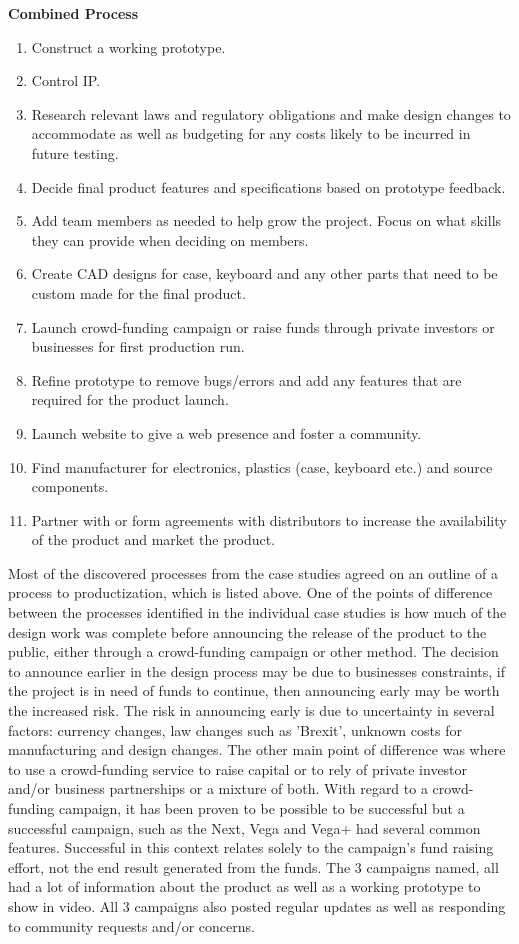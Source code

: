 \textbf{Combined Process}
\begin{enumerate}
\item Construct a working prototype.
\item Control IP.
\item Research relevant laws and regulatory obligations and make design changes to accommodate as well as budgeting for any costs likely to be incurred in future testing.
\item Decide final product features and specifications based on prototype feedback.
\item Add team members as needed to help grow the project. Focus on what skills they can provide when deciding on members.
\item Create CAD designs for case, keyboard and any other parts that need to be custom made for the final product.
\item Launch crowd-funding campaign or raise funds through private investors or businesses for first production run.
\item Refine prototype to remove bugs/errors and add any features that are required for the product launch.
\item Launch website to give a web presence and foster a community.
\item Find manufacturer for electronics, plastics (case, keyboard etc.) and source components.
\item Partner with or form agreements with distributors to increase the availability of the product and market the product.
\end{enumerate} 

Most of the discovered processes from the case studies agreed on an outline of a process to productization, which is listed above. One of the points of difference between the processes identified in the individual case studies is how much of the design work was complete before announcing the release of the product to the public, either through a crowd-funding campaign or other method. The decision to announce earlier in the design process may be due to businesses constraints, if the project is in need of funds to continue, then announcing early may be worth the increased risk. The risk in announcing early is due to uncertainty in several factors: currency changes, law changes such as 'Brexit', unknown costs for manufacturing and design changes. The other main point of difference was where to use a crowd-funding service to raise capital or to rely of private investor and/or business partnerships or a mixture of both. With regard to a crowd-funding campaign, it has been proven to be possible to be successful but a successful campaign, such as the Next, Vega and Vega+ had several common features. Successful in this context relates solely to the campaign's fund raising effort, not the end result generated from the funds. The 3 campaigns named, all had a lot of information about the product as well as a working prototype to show in video. All 3 campaigns also posted regular updates as well as responding to community requests and/or concerns.


